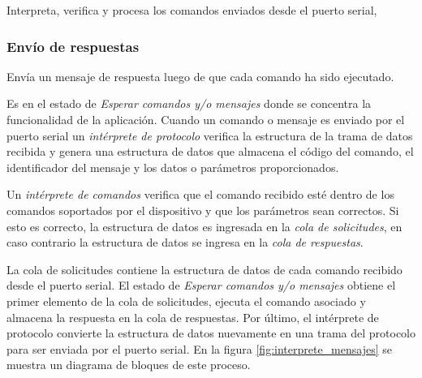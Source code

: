Interpreta, verifica y procesa los comandos enviados desde el puerto serial,

\subsubsection{Envío de respuestas}

Envía un mensaje de respuesta luego de que cada comando ha sido ejecutado. 


Es en el estado de \textit{Esperar comandos y/o mensajes} donde se concentra la funcionalidad de la aplicación. Cuando un comando o mensaje es enviado por el puerto serial un \textit{intérprete de protocolo} verifica la estructura de la trama de datos recibida y genera una estructura de datos que almacena el código del comando, el identificador del mensaje y los datos o parámetros proporcionados. 

Un \textit{intérprete de comandos} verifica que el comando recibido esté dentro de los comandos soportados por el dispositivo y que los parámetros sean correctos. Si esto es correcto, la estructura de datos es ingresada en la \textit{cola de solicitudes}, en caso contrario la estructura de datos se ingresa en la \textit{cola de respuestas}. 

La cola de solicitudes contiene la estructura de datos de cada comando recibido desde el puerto serial. El estado de \textit{Esperar comandos y/o mensajes} obtiene el primer elemento de la cola de solicitudes, ejecuta el comando asociado y almacena la respuesta en la cola de respuestas. Por último, el intérprete de protocolo convierte la estructura de datos nuevamente en una trama del protocolo para ser enviada por el puerto serial. En la figura \ref{fig:interprete_mensajes} se muestra un diagrama de bloques de este proceso. 





